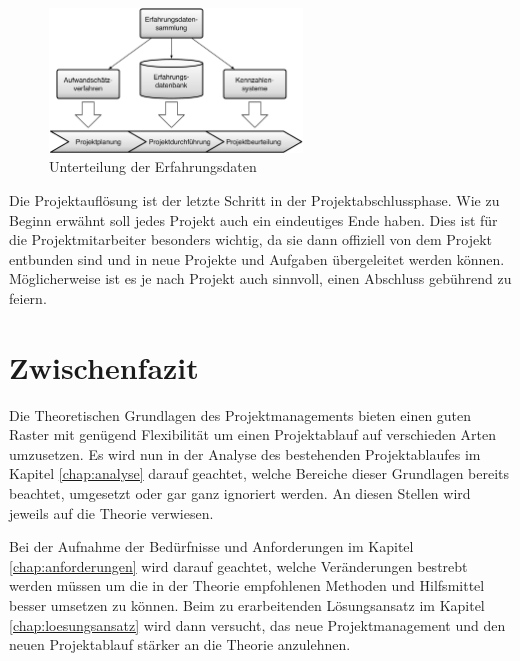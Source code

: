\begin{figure}[htbp]
\begin{center}
\includegraphics[width=0.6\textwidth,angle=0]{./bilder/theorie/04_unterteilung_erfahrungsdaten.pdf}
\caption[Unterteilung der Erfahrungsdaten]{Unterteilung der Erfahrungsdaten\footnotemark}
\label{pic:04_unterteilung_erfahrungsdaten}
\end{center}
\end{figure}

Die Projektauflösung ist der letzte Schritt in der Projektabschlussphase. Wie 
zu Beginn erwähnt soll jedes Projekt auch ein eindeutiges Ende haben. Dies ist
für die Projektmitarbeiter besonders wichtig, da sie dann offiziell von dem
Projekt entbunden sind und in neue Projekte und Aufgaben übergeleitet werden
können. Möglicherweise ist es je nach Projekt auch sinnvoll, einen Abschluss
gebührend zu feiern.

\section{Zwischenfazit}
Die Theoretischen Grundlagen des Projektmanagements bieten einen guten Raster
mit genügend Flexibilität um einen Projektablauf auf verschieden Arten umzusetzen.
Es wird nun in der Analyse des bestehenden Projektablaufes im Kapitel \ref{chap:analyse}
darauf geachtet, welche Bereiche dieser Grundlagen bereits beachtet, umgesetzt
oder gar ganz ignoriert werden. An diesen Stellen wird jeweils auf die Theorie
verwiesen.

Bei der Aufnahme der Bedürfnisse und Anforderungen im Kapitel \ref{chap:anforderungen} 
wird darauf geachtet, welche Veränderungen bestrebt werden müssen um die in 
der Theorie empfohlenen Methoden und Hilfsmittel besser umsetzen zu können.
Beim zu erarbeitenden Lösungsansatz im Kapitel \ref{chap:loesungsansatz} wird dann versucht, 
das neue Projektmanagement und den neuen Projektablauf stärker an die Theorie 
anzulehnen.